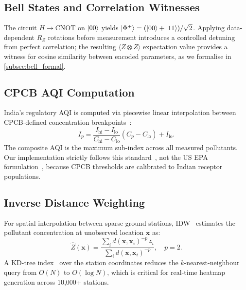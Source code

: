 \documentclass[conference]{IEEEtran}
\begin{document}
\subsection{Bell States and Correlation Witnesses}

The circuit $H \to \mathrm{CNOT}$ on $\ket{00}$ yields
$\ket{\Phi^+} = (\ket{00}+\ket{11})/\sqrt{2}$.
Applying data-dependent $R_Z$ rotations before measurement introduces
a controlled detuning from perfect correlation; the resulting
$\langle Z \otimes Z \rangle$ expectation value provides a witness for
cosine similarity between encoded parameters, as we formalise in
\cref{subsec:bell_formal}.

\subsection{CPCB AQI Computation}

India's regulatory AQI is computed via piecewise linear interpolation
between CPCB-defined concentration breakpoints~\cite{cpcb2014}:
\begin{equation}\label{eq:aqi}
I_p = \frac{I_{\mathrm{hi}} - I_{\mathrm{lo}}}{C_{\mathrm{hi}} - C_{\mathrm{lo}}}
(C_p - C_{\mathrm{lo}}) + I_{\mathrm{lo}}.
\end{equation}
The composite AQI is the maximum sub-index across all measured pollutants.
Our implementation strictly follows this standard~\cite{cpcb2014}, not
the US EPA formulation~\cite{epa2012naaqs}, because CPCB thresholds are
calibrated to Indian receptor populations.

\subsection{Inverse Distance Weighting}

For spatial interpolation between sparse ground stations, IDW~\cite{shepard1968two}
estimates the pollutant concentration at unobserved location $\mathbf{x}$ as:
\begin{equation}\label{eq:idw}
\hat{Z}(\mathbf{x}) =
\frac{\displaystyle\sum_i d(\mathbf{x}, \mathbf{x}_i)^{-p}\, z_i}
     {\displaystyle\sum_i d(\mathbf{x}, \mathbf{x}_i)^{-p}},
\quad p = 2.
\end{equation}
A KD-tree index~\cite{bentley1975kd} over the station coordinates reduces
the $k$-nearest-neighbour query from $O(N)$ to $O(\log N)$, which is
critical for real-time heatmap generation across 10,000+ stations.


\end{document}
